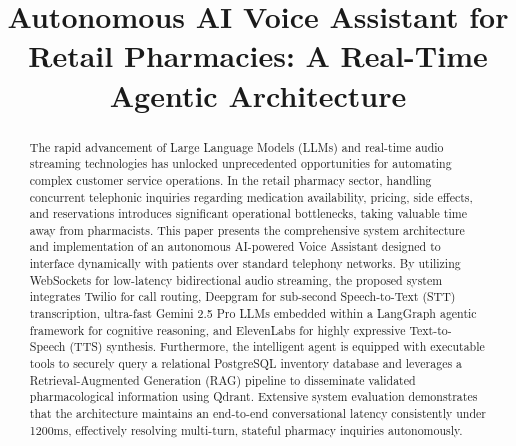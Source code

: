 \documentclass[conference,a4paper]{IEEEtran}
\begin{document}
\title{Autonomous AI Voice Assistant for Retail Pharmacies: A Real-Time Agentic Architecture}

\author{
\and
{}
}

\maketitle

\begin{abstract}
The rapid advancement of Large Language Models (LLMs) and real-time audio streaming technologies has unlocked unprecedented opportunities for automating complex customer service operations. In the retail pharmacy sector, handling concurrent telephonic inquiries regarding medication availability, pricing, side effects, and reservations introduces significant operational bottlenecks, taking valuable time away from pharmacists. This paper presents the comprehensive system architecture and implementation of an autonomous AI-powered Voice Assistant designed to interface dynamically with patients over standard telephony networks. By utilizing WebSockets for low-latency bidirectional audio streaming, the proposed system integrates Twilio for call routing, Deepgram for sub-second Speech-to-Text (STT) transcription, ultra-fast Gemini 2.5 Pro LLMs embedded within a LangGraph agentic framework for cognitive reasoning, and ElevenLabs for highly expressive Text-to-Speech (TTS) synthesis. Furthermore, the intelligent agent is equipped with executable tools to securely query a relational PostgreSQL inventory database and leverages a Retrieval-Augmented Generation (RAG) pipeline to disseminate validated pharmacological information using Qdrant. Extensive system evaluation demonstrates that the architecture maintains an end-to-end conversational latency consistently under 1200ms, effectively resolving multi-turn, stateful pharmacy inquiries autonomously. 
\end{abstract}
\end{document}

